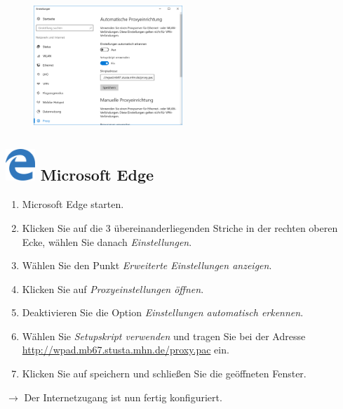 \documentclass[a4paper,12pt]{scrartcl}
\begin{document}
\newpage
\begin{figure}
	\begin{center}
		\includegraphics[width=0.5\textwidth,keepaspectratio]{Bilder/Proxy_Edge_mb}
	\end{center}
\end{figure}

\subsection*{\includegraphics[height=1.2cm,keepaspectratio]{Bilder/Mcrosoft_Edge_logo} Microsoft Edge}
\begin{enumerate}
	\item Microsoft Edge starten.
	\item Klicken Sie auf die 3 übereinanderliegenden Striche in der rechten oberen Ecke, wählen Sie danach \emph{Einstellungen}.
	\item Wählen Sie den Punkt \emph{Erweiterte Einstellungen anzeigen}.
	\item Klicken Sie auf \emph{Proxyeinstellungen öffnen}.
	\item Deaktivieren Sie die Option \emph{Einstellungen automatisch erkennen}.
	\item Wählen Sie \emph{Setupskript verwenden} und tragen Sie bei der Adresse \\ \url{http://wpad.mb67.stusta.mhn.de/proxy.pac} ein.
	\item Klicken Sie auf speichern und schließen Sie die geöffneten Fenster.
\end{enumerate}
$\rightarrow$ Der Internetzugang ist nun fertig konfiguriert.
\end{document}
